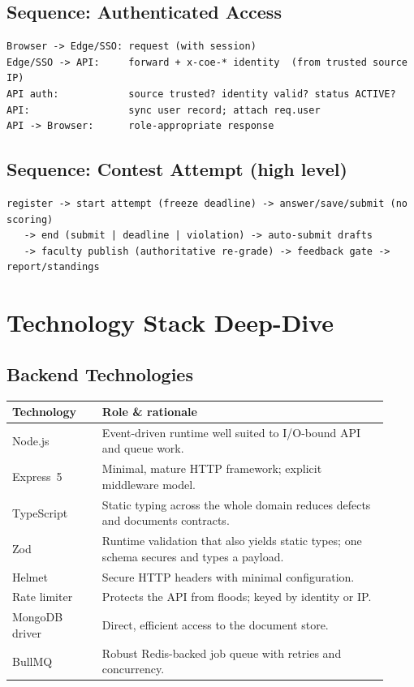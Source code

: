 \documentclass[12pt,a4paper,oneside]{report}
\begin{document}
\section{Sequence: Authenticated Access}
\begin{lstlisting}[language={}]
Browser -> Edge/SSO: request (with session)
Edge/SSO -> API:     forward + x-coe-* identity  (from trusted source IP)
API auth:            source trusted? identity valid? status ACTIVE?
API:                 sync user record; attach req.user
API -> Browser:      role-appropriate response
\end{lstlisting}

\section{Sequence: Contest Attempt (high level)}
\begin{lstlisting}[language={}]
register -> start attempt (freeze deadline) -> answer/save/submit (no scoring)
   -> end (submit | deadline | violation) -> auto-submit drafts
   -> faculty publish (authoritative re-grade) -> feedback gate -> report/standings
\end{lstlisting}

\chapter{Technology Stack Deep-Dive}
\section{Backend Technologies}
\begin{longtable}{@{}p{0.22\linewidth} p{0.70\linewidth}@{}}
\toprule
\textbf{Technology} & \textbf{Role \& rationale}\\
\midrule
\endhead
Node.js & Event-driven runtime well suited to I/O-bound API and queue work.\\
Express~5 & Minimal, mature HTTP framework; explicit middleware model.\\
TypeScript & Static typing across the whole domain reduces defects and documents contracts.\\
Zod & Runtime validation that also yields static types; one schema secures and types a payload.\\
Helmet & Secure HTTP headers with minimal configuration.\\
Rate limiter & Protects the API from floods; keyed by identity or IP.\\
MongoDB driver & Direct, efficient access to the document store.\\
BullMQ & Robust Redis-backed job queue with retries and concurrency.\\
\bottomrule
\end{longtable}
\end{document}
